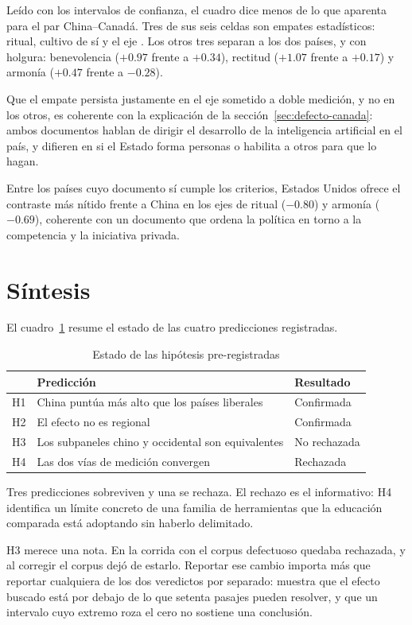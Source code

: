 Leído con los intervalos de confianza, el cuadro dice menos de lo que aparenta para el par China--Canadá. Tres de sus seis celdas son empates estadísticos: ritual, cultivo de sí y el eje \dezhi. Los otros tres separan a los dos países, y con holgura: benevolencia ($+0.97$ frente a $+0.34$), rectitud ($+1.07$ frente a $+0.17$) y armonía ($+0.47$ frente a $-0.28$).

Que el empate persista justamente en el eje sometido a doble medición, y no en los otros, es coherente con la explicación de la sección~\ref{sec:defecto-canada}: ambos documentos hablan de dirigir el desarrollo de la inteligencia artificial en el país, y difieren en si el Estado forma personas o habilita a otros para que lo hagan.

Entre los países cuyo documento sí cumple los criterios, Estados Unidos ofrece el contraste más nítido frente a China en los ejes de ritual ($-0.80$) y armonía ($-0.69$), coherente con un documento que ordena la política en torno a la competencia y la iniciativa privada.

\section{Síntesis}

El cuadro~\ref{tab:hipotesis} resume el estado de las cuatro predicciones registradas.

\begin{table}[htbp]
\centering
\caption{Estado de las hipótesis pre-registradas}
\label{tab:hipotesis}
\begin{tabular}{lp{7.2cm}l}
\hline
& \textbf{Predicción} & \textbf{Resultado} \\
\hline
H1 & China puntúa más alto que los países liberales & Confirmada \\
H2 & El efecto no es regional & Confirmada \\
H3 & Los subpaneles chino y occidental son equivalentes & No rechazada \\
H4 & Las dos vías de medición convergen & Rechazada \\
\hline
\end{tabular}
\end{table}

Tres predicciones sobreviven y una se rechaza. El rechazo es el informativo: H4 identifica un límite concreto de una familia de herramientas que la educación comparada está adoptando sin haberlo delimitado.

H3 merece una nota. En la corrida con el corpus defectuoso quedaba rechazada, y al corregir el corpus dejó de estarlo. Reportar ese cambio importa más que reportar cualquiera de los dos veredictos por separado: muestra que el efecto buscado está por debajo de lo que setenta pasajes pueden resolver, y que un intervalo cuyo extremo roza el cero no sostiene una conclusión.
